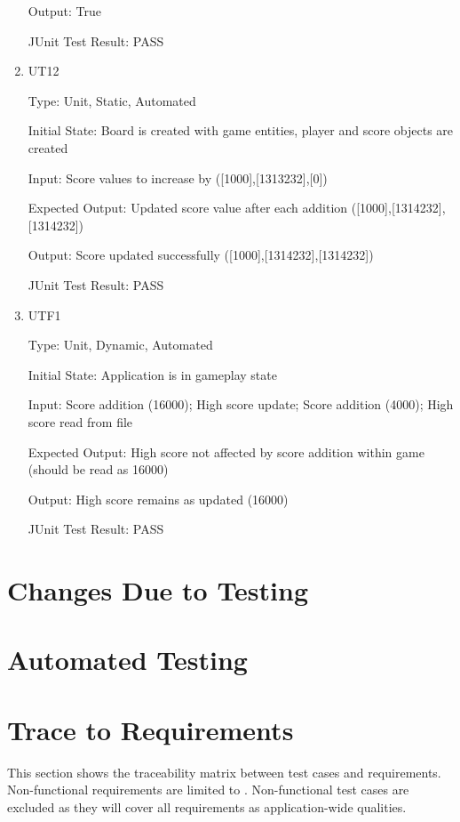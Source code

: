 \documentclass[12pt, titlepage]{article}
\begin{document}
\begin{enumerate}
Output: True

JUnit Test Result: PASS

\item{\label{ut12}{UT12}\\}

Type: Unit, Static, Automated
					
Initial State: Board is created with game entities, player and score objects are created
					
Input: Score values to increase by ([1000],[1313232],[0])
					
Expected Output: Updated score value after each addition ([1000],[1314232],[1314232])
					
Output: Score updated successfully ([1000],[1314232],[1314232])

JUnit Test Result: PASS

\item{\label{utf1}{UTF1}\\}

Type: Unit, Dynamic, Automated
					
Initial State: Application is in gameplay state
					
Input: Score addition (16000); High score update; Score addition (4000); High score read from file
					
Expected Output: High score not affected by score addition within game (should be read as 16000)
					
Output: High score remains as updated (16000)

JUnit Test Result: PASS

\end{enumerate}

\section{Changes Due to Testing}

\section{Automated Testing}
		
\section{Trace to Requirements}
This section shows the traceability matrix between test cases and requirements. Non-functional requirements are limited to . Non-functional test cases are excluded as they will cover all requirements as application-wide qualities.
\end{document}
